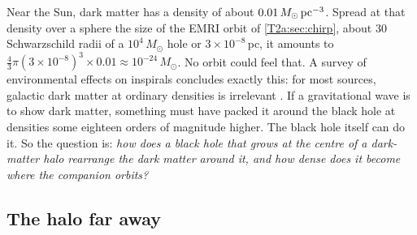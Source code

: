 Near the Sun, dark matter has a density of about $0.01\,M_\odot\,{\rm pc}^{-3}$. Spread at that density over a sphere the size of the EMRI orbit of \cref{T2a:sec:chirp}, about $30$ Schwarzschild radii of a $10^4\,M_\odot$ hole or $3\times10^{-8}$\,pc, it amounts to $\tfrac43\pi(3\times10^{-8})^3\times0.01\approx10^{-24}\,M_\odot$. No orbit could feel that. A survey of environmental effects on inspirals concludes exactly this: for most sources, galactic dark matter at ordinary densities is irrelevant \cite[Sec.~IX]{Barausse2014}. If a gravitational wave is to show dark matter, something must have packed it around the black hole at densities some eighteen orders of magnitude higher. The black hole itself can do it. So the question is: \emph{how does a black hole that grows at the centre of a dark-matter halo rearrange the dark matter around it, and how dense does it become where the companion orbits?}

\subsection{The halo far away}

